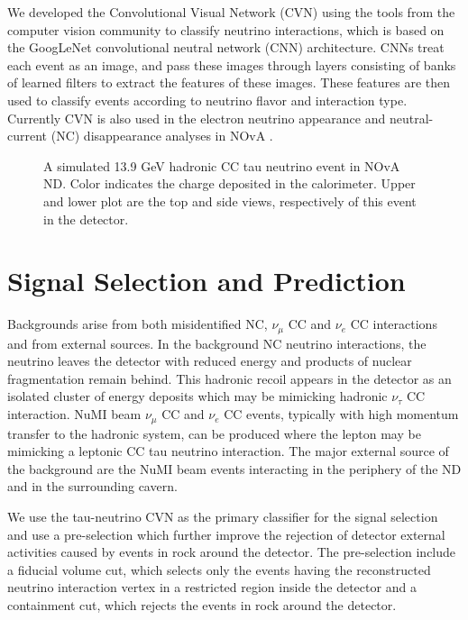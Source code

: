 \documentclass[12pt]{article}
\begin{document}
 We developed the Convolutional Visual Network (CVN) \cite{Aurisano}using the tools from the computer vision community to classify neutrino interactions, which is based on the GoogLeNet convolutional neutral network (CNN) architecture. CNNs treat each event as an image, and pass these images through layers consisting of banks of learned filters to extract the features of these images. These features are then used to classify events according to neutrino flavor and interaction type. Currently CVN is also used in the electron neutrino appearance \cite{NOvA_nue_2017} and neutral-current (NC) disappearance analyses in NOvA \cite{NOvA_nc_2016}. 
 \begin{figure}[H]
\begin{center}
\caption{A simulated 13.9 GeV hadronic CC tau neutrino event in NOvA ND. Color indicates the charge deposited in the calorimeter. Upper and lower plot are the top and side views, respectively of this event in the detector.}
\label{fig:magnet}
\end{center}
\end{figure}


\section{Signal Selection and Prediction}

Backgrounds arise from both misidentified NC, $\nu_{\mu}$ CC and $\nu_e$ CC interactions and from external sources. In the background NC neutrino interactions, the neutrino leaves the detector with reduced energy and products of nuclear fragmentation remain behind. This hadronic recoil appears in the detector as an isolated cluster of energy deposits which may be mimicking hadronic $\nu_{\tau}$ CC interaction. NuMI beam $\nu_{\mu}$ CC and $\nu_e$ CC events, typically with high momentum transfer to the hadronic system, can be produced where the lepton may be mimicking a leptonic CC tau neutrino interaction. The major external  source of the background are the NuMI beam events interacting in the periphery of the ND and in the surrounding cavern. 

We use the tau-neutrino CVN as the primary classifier for the signal selection and use a pre-selection which further improve the rejection of detector external activities caused by events in rock around the detector. The pre-selection include a fiducial volume cut, which selects only the events having the reconstructed neutrino interaction vertex in a restricted region inside the detector and a containment cut, which rejects the events in rock around the detector.
\end{document}
